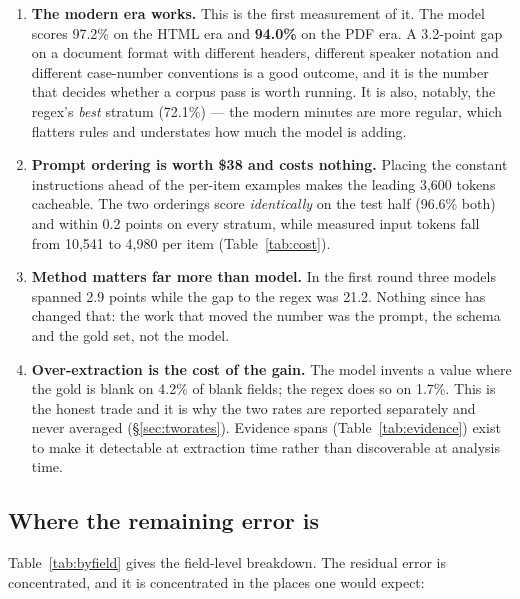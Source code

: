 \documentclass[11pt]{article}
\begin{document}
\begin{enumerate}
\item \textbf{The modern era works.} This is the first measurement of it. The model scores
97.2\% on the HTML era and \textbf{94.0\%} on the PDF era. A 3.2-point gap on a document
format with different headers, different speaker notation and different case-number
conventions is a good outcome, and it is the number that decides whether a corpus pass is
worth running. It is also, notably, the regex's \emph{best} stratum (72.1\%) --- the modern
minutes are more regular, which flatters rules and understates how much the model is adding.

\item \textbf{Prompt ordering is worth \$38 and costs nothing.} Placing the constant
instructions ahead of the per-item examples makes the leading 3{,}600 tokens cacheable. The
two orderings score \emph{identically} on the test half (96.6\% both) and within 0.2 points on
every stratum, while measured input tokens fall from 10{,}541 to 4{,}980 per item
(Table~\ref{tab:cost}).

\item \textbf{Method matters far more than model.} In the first round three models spanned 2.9
points while the gap to the regex was 21.2. Nothing since has changed that: the work that
moved the number was the prompt, the schema and the gold set, not the model.

\item \textbf{Over-extraction is the cost of the gain.} The model invents a value where the
gold is blank on 4.2\% of blank fields; the regex does so on 1.7\%. This is the honest
trade and it is why the two rates are reported separately and never averaged
(\S\ref{sec:tworates}). Evidence spans (Table~\ref{tab:evidence}) exist to make it
detectable at extraction time rather than discoverable at analysis time.
\end{enumerate}

\subsection{Where the remaining error is}

Table~\ref{tab:byfield} gives the field-level breakdown. The residual error is concentrated,
and it is concentrated in the places one would expect:
\end{document}
